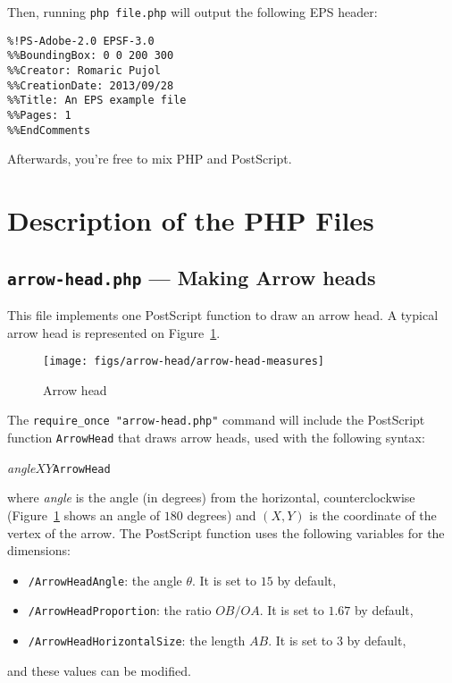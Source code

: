 \documentclass[10pt,a4paper]{scrartcl}
\newcommand\code[1]{\lstinline{#1}}
\newcommand\PS{PostScript}
\begin{document}
Then, running \code{php file.php} will output the following EPS header:
\begin{lstlisting}
%!PS-Adobe-2.0 EPSF-3.0
%%BoundingBox: 0 0 200 300
%%Creator: Romaric Pujol
%%CreationDate: 2013/09/28
%%Title: An EPS example file
%%Pages: 1
%%EndComments
\end{lstlisting}

Afterwards, you're free to mix PHP and \PS.

\section{Description of the PHP Files}
\subsection{\texttt{arrow-head.php} --- Making Arrow heads}
\label{ssec:arrow-head.php}
This file implements one \PS{} function to draw an arrow head.
A typical arrow head is represented on Figure~\ref{fig:arrow-head-explained}.
\begin{figure}[ht!]%
\centering
\texttt{[image: figs/arrow-head/arrow-head-measures]}%
\caption{Arrow head}%
\label{fig:arrow-head-explained}
\end{figure}

The \code{require_once "arrow-head.php"} command will include the \PS{} function
\texttt{ArrowHead} that draws arrow heads, used with the following syntax:
\begin{center}
\textit{angle}\quad$X$\quad$Y$\quad\texttt{ArrowHead}
\end{center}
where \textit{angle} is the angle (in degrees) from the horizontal,
counterclockwise (Figure~\ref{fig:arrow-head-explained} shows an angle of $180$
degrees) and $(X,Y)$ is the coordinate of the vertex of the arrow.
The \PS{} function uses the following variables for the dimensions:
\begin{itemize}
\item \texttt{/ArrowHeadAngle}: the angle $\theta$. It is set to $15$ by default,
\item \texttt{/ArrowHeadProportion}: the ratio $OB/OA$. It is set to $1.67$ by default,
\item \texttt{/ArrowHeadHorizontalSize}: the length $AB$. It is set to $3$ by default,
\end{itemize}
and these values can be modified.
\end{document}
